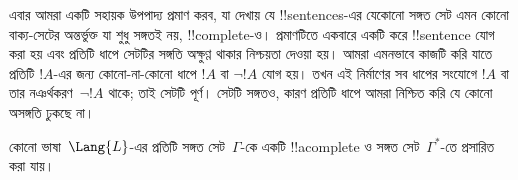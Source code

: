 \documentclass[../../../include/open-logic-section]{subfiles}
\begin{document}
      {}
      {}


\begin{explain}
এবার আমরা একটি সহায়ক উপপাদ্য প্রমাণ করব, যা দেখায় যে
!!{sentence}s-এর যেকোনো সঙ্গত সেট এমন কোনো বাক্য-সেটের অন্তর্ভুক্ত যা
শুধু সঙ্গতই নয়, !!{complete}-ও। প্রমাণটিতে একবারে একটি করে !!{sentence}
যোগ করা হয় এবং প্রতিটি ধাপে সেটটির সঙ্গতি অক্ষুণ্ণ থাকার নিশ্চয়তা দেওয়া
হয়। আমরা এমনভাবে কাজটি করি যাতে প্রতিটি $!A$-এর জন্য কোনো-না-কোনো ধাপে
$!A$ বা $\lnot !A$ যোগ হয়। তখন এই নির্মাণের সব ধাপের সংযোগে $!A$ বা তার
নঞর্থকরণ~$\lnot !A$ থাকে; তাই সেটটি পূর্ণ। সেটটি সঙ্গতও, কারণ প্রতিটি
ধাপে আমরা নিশ্চিত করি যে কোনো অসঙ্গতি ঢুকছে না।
\end{explain}

\begin{lem}[লিন্ডেনবাউমের সহায়ক উপপাদ্য]
 কোনো ভাষা~$\Lang{L}$-এর প্রতিটি সঙ্গত
সেট~$\Gamma$-কে একটি !!a{complete} ও সঙ্গত সেট~$\Gamma^*$-তে প্রসারিত
করা যায়।
\end{lem}
\end{document}
